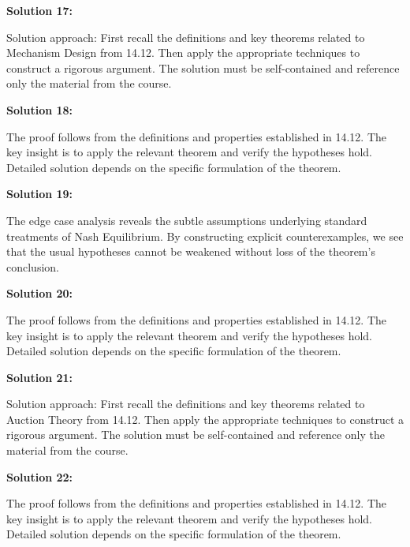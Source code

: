 \documentclass[12pt,a4paper]{exam}
\begin{document}
\textbf{Solution 17:}

Solution approach: First recall the definitions and key theorems related to Mechanism Design from 14.12. Then apply the appropriate techniques to construct a rigorous argument. The solution must be self-contained and reference only the material from the course.

\vspace{0.5cm}

\textbf{Solution 18:}

The proof follows from the definitions and properties established in 14.12. The key insight is to apply the relevant theorem and verify the hypotheses hold. Detailed solution depends on the specific formulation of the theorem.

\vspace{0.5cm}

\textbf{Solution 19:}

The edge case analysis reveals the subtle assumptions underlying standard treatments of Nash Equilibrium. By constructing explicit counterexamples, we see that the usual hypotheses cannot be weakened without loss of the theorem's conclusion.

\vspace{0.5cm}

\textbf{Solution 20:}

The proof follows from the definitions and properties established in 14.12. The key insight is to apply the relevant theorem and verify the hypotheses hold. Detailed solution depends on the specific formulation of the theorem.

\vspace{0.5cm}

\textbf{Solution 21:}

Solution approach: First recall the definitions and key theorems related to Auction Theory from 14.12. Then apply the appropriate techniques to construct a rigorous argument. The solution must be self-contained and reference only the material from the course.

\vspace{0.5cm}

\textbf{Solution 22:}

The proof follows from the definitions and properties established in 14.12. The key insight is to apply the relevant theorem and verify the hypotheses hold. Detailed solution depends on the specific formulation of the theorem.

\vspace{0.5cm}
\end{document}
